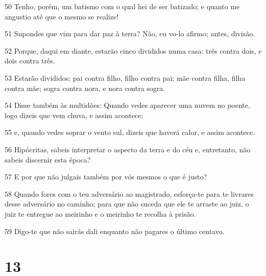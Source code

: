 \par 50 Tenho, porém, um batismo com o qual hei de ser batizado; e quanto me angustio até que o mesmo se realize!
\par 51 Supondes que vim para dar paz à terra? Não, eu vo-lo afirmo; antes, divisão.
\par 52 Porque, daqui em diante, estarão cinco divididos numa casa: três contra dois, e dois contra três.
\par 53 Estarão divididos: pai contra filho, filho contra pai; mãe contra filha, filha contra mãe; sogra contra nora, e nora contra sogra.
\par 54 Disse também às multidões: Quando vedes aparecer uma nuvem no poente, logo dizeis que vem chuva, e assim acontece;
\par 55 e, quando vedes soprar o vento sul, dizeis que haverá calor, e assim acontece.
\par 56 Hipócritas, sabeis interpretar o aspecto da terra e do céu e, entretanto, não sabeis discernir esta época?
\par 57 E por que não julgais também por vós mesmos o que é justo?
\par 58 Quando fores com o teu adversário ao magistrado, esforça-te para te livrares desse adversário no caminho; para que não suceda que ele te arraste ao juiz, o juiz te entregue ao meirinho e o meirinho te recolha à prisão.
\par 59 Digo-te que não sairás dali enquanto não pagares o último centavo.

\chapter{13}

